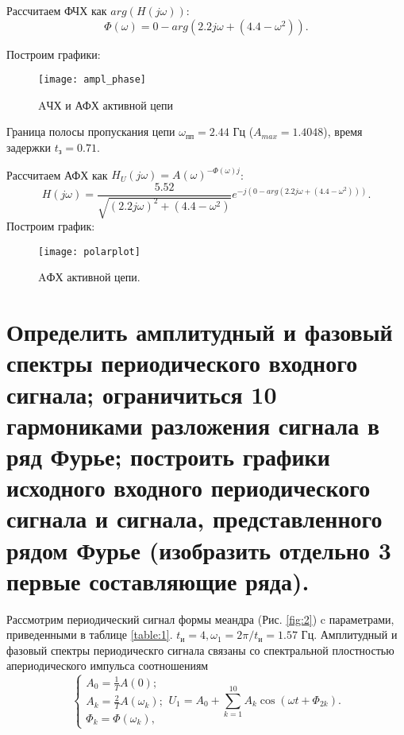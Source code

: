 \documentclass[a4paper,14pt ]{article} %
\begin{document}
    Рассчитаем ФЧХ как $arg(H(j\omega))$:
    \begin{equation}
        \Phi(\omega) = 0 - arg(2.2j\omega + (4.4 - \omega^2)).
    \end{equation} 
    
    Построим графики:
    \begin{figure}[H]
        \centering
        \texttt{[image: ampl\_phase]}
        \caption{AЧХ и АФХ активной цепи}
    \end{figure}
    
    Граница полосы пропускания цепи $\omega_\text{пп} = 2.44$ Гц ($A_{max} = 1.4048$),
    время задержки $t_\text{з} = 0.71$.
    
    Рассчитаем АФХ как $H_U(j\omega) = A(\omega)^{-\Phi(\omega)j}$:
    \begin{equation}
        H(j\omega) = \frac{5.52}{\sqrt{(2.2j\omega)^2 + (4.4 - \omega^2)}}e^{-j(0 - arg(2.2j\omega + (4.4 - \omega^2)))}.
    \end{equation}
    Построим график:
    \begin{figure}[H]
        \centering
        \texttt{[image: polarplot]}
        \caption{AФХ активной цепи.}
    \end{figure}
    \section{Определить амплитудный и фазовый спектры периодического 
    входного сигнала;
     ограничиться 10 гармониками разложения сигнала в ряд Фурье; 
     построить графики исходного входного периодического сигнала и сигнала, представленного рядом Фурье 
    (изобразить отдельно 3 первые составляющие ряда).}
    Рассмотрим периодический сигнал формы меандра (Рис. \ref{fig:2}) c параметрами, 
    приведенными в таблице \ref{table:1}. $t_\text{и} = 4, \omega_1 = 2\pi/t_\text{и} = 
    1.57$ Гц.
    Амплитудный и фазовый спектры периодическго сигнала связаны со спектральной плостностью
    апериодического импульса соотношениям
    \begin{equation}
        \begin{cases}
            A_0 = \frac{1}{T}A(0);\\
        A_k = \frac{2}{T}A(\omega_k);\\
        \Phi_k = \Phi(\omega_k),
        \end{cases}
    U_1 = A_0 + \sum_{k=1}^{10}A_{k}\cos(\omega t + \Phi_{2k}).
    \end{equation}
\end{document}
